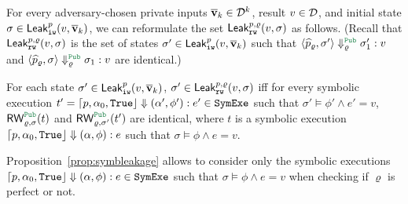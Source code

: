 %
%



For every adversary-chosen private inputs $\overline{\bf{v}}_k\in\mathcal{D}^k$, result $v\in\mathcal{D}$,
and  initial state $\sigma\in{\sf Leak}_{\tt iw}^p(v,\overline{\bf{v}}_k)$,
we can reformulate the set ${\sf Leak}_{\tt rw}^{p,\varrho}(v,\sigma)$ as follows.
(Recall that ${\sf Leak}_{\tt rw}^{p,\varrho}(v,\sigma)$ is
the set of states $\sigma'\in{\sf Leak}_{\tt iw}^p(v,\overline{\bf{v}}_k)$ such that
$\MPCAngle{\widehat{p}_\varrho,\sigma'}\Downarrow_\varrho^{\Pub} \sigma_1':v$
and $\MPCAngle{\widehat{p}_\varrho,\sigma}\Downarrow_\varrho^{\Pub} \sigma_1:v$ are identical.)

\begin{proposition}\label{prop:symbleakage}
For each state $\sigma'\in{\sf Leak}_{\tt iw}^p(v,\overline{\bf{v}}_k)$,
$\sigma'\in{\sf Leak}_{\tt rw}^{p,\varrho}(v,\sigma)$ iff for every symbolic execution $t'=\lceil{p, \alpha_0,{\tt True}}\rfloor\Downarrow
(\alpha',\phi'):e'\in {\tt SymExe}$ such that $\sigma'\models \phi'\wedge e'=v$,   $\RW_{\varrho,\sigma}^{\Pub}(t)$ and $\RW_{\varrho,\sigma'}^{\Pub}(t')$ are identical,
where $t$ is a symbolic execution $\lceil{p, \alpha_0,{\tt True}}\rfloor\Downarrow
(\alpha,\phi):e$ such that $\sigma\models \phi\wedge e=v$.
\end{proposition}

Proposition~\ref{prop:symbleakage} allows to consider only the symbolic executions $\lceil{p, \alpha_0,{\tt True}}\rfloor\Downarrow
(\alpha,\phi):e\in {\tt SymExe}$ such that $\sigma\models \phi\wedge e=v$ when checking
if $\varrho$ is perfect or not.


